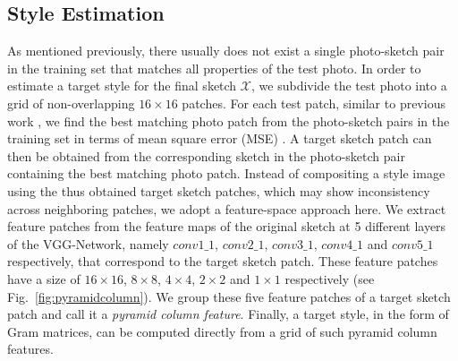 \documentclass[10pt,twocolumn,letterpaper]{article}
\def\blue[#1]{{#1}}
\newcommand\ken[1]{{\small \textcolor{red}{\emph{}}}}
\begin{document}
\subsection{Style Estimation} \label{subsec:pyramid_feature_column}
As mentioned previously, there usually does not exist a single photo-sketch pair in the training set that matches all properties of the test photo. In order to estimate a target style for the final sketch $\mathcal{X}$, we subdivide the test photo into a grid of non-overlapping $16\times16$ patches. For each test patch, similar to previous work  \cite{wang2009face,zhou2012markov}, we find the best matching photo patch from the photo-sketch pairs in the training set in terms of \blue[mean square error (MSE)] \ken{defines MSE}. A target sketch patch can then be obtained from the corresponding sketch in the photo-sketch pair containing the best matching photo patch. Instead of compositing a style image using the thus obtained target sketch patches, which may show inconsistency across neighboring patches, we adopt a feature-space approach here. We extract feature patches from the feature maps of the original sketch at 5 different layers of the VGG-Network, namely $conv1\_1$, $conv2\_1$, $conv3\_1$, $conv4\_1$ and $conv5\_1$ respectively, that correspond to the target sketch patch. These feature patches have a size of $16\times16$, $8\times8$, $4\times4$, $2\times2$ and $1\times1$ respectively (see Fig.~\ref{fig:pyramidcolumn}). We group these five feature patches of a target sketch patch and call it a  {\em pyramid column feature}. Finally, a target style, in the form of Gram matrices, can be computed directly from a grid of such pyramid column features.

\end{document}
